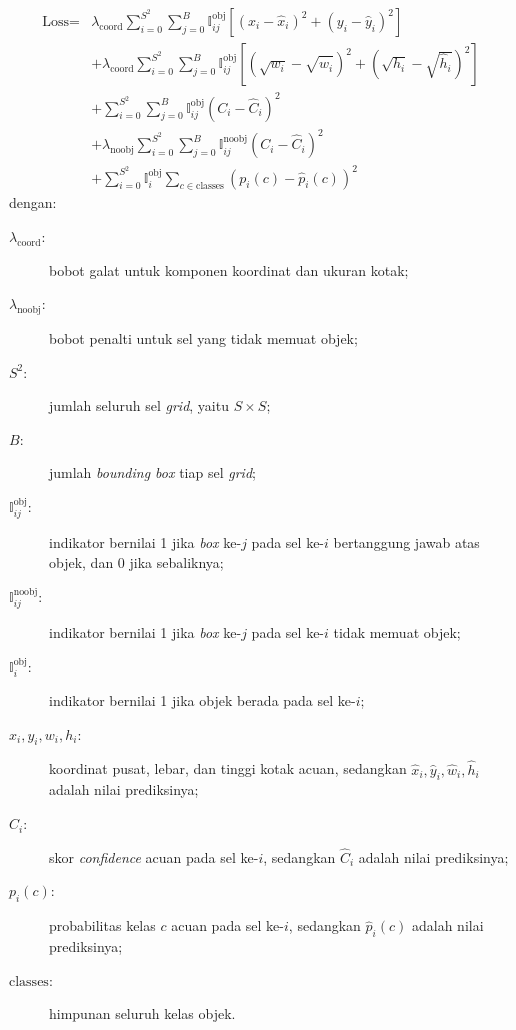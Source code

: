 \begin{equation}
\label{eq:yolo_loss}
\begin{split} \text{Loss} = & \lambda_{\text{coord}} \sum_{i=0}^{S^2} \sum_{j=0}^{B} \mathbb{I}_{ij}^{\text{obj}} \left[ (x_i - \hat{x}_i)^2 + (y_i - \hat{y}_i)^2 \right] \\ & + \lambda_{\text{coord}} \sum_{i=0}^{S^2} \sum_{j=0}^{B} \mathbb{I}_{ij}^{\text{obj}} \left[ (\sqrt{w_i} - \sqrt{\hat{w}_i})^2 + (\sqrt{h_i} - \sqrt{\hat{h}_i})^2 \right] \\ & + \sum_{i=0}^{S^2} \sum_{j=0}^{B} \mathbb{I}_{ij}^{\text{obj}} (C_i - \hat{C}_i)^2 \\ & + \lambda_{\text{noobj}} \sum_{i=0}^{S^2} \sum_{j=0}^{B} \mathbb{I}_{ij}^{\text{noobj}} (C_i - \hat{C}_i)^2 \\ & + \sum_{i=0}^{S^2} \mathbb{I}_{i}^{\text{obj}} \sum_{c \in \text{classes}} (p_i(c) - \hat{p}_i(c))^2
\end{split}
\end{equation}
\noindent dengan:
\begin{description}
  \item[$\lambda_{\text{coord}}$:] bobot galat untuk komponen koordinat dan ukuran kotak;
  \item[$\lambda_{\text{noobj}}$:] bobot penalti untuk sel yang tidak memuat objek;
  \item[$S^2$:] jumlah seluruh sel \textit{grid}, yaitu $S \times S$;
  \item[$B$:] jumlah \textit{bounding box} tiap sel \textit{grid};
  \item[$\mathbb{I}_{ij}^{\text{obj}}$:] indikator bernilai 1 jika \textit{box} ke-$j$ pada sel ke-$i$ bertanggung jawab atas objek, dan 0 jika sebaliknya;
  \item[$\mathbb{I}_{ij}^{\text{noobj}}$:] indikator bernilai 1 jika \textit{box} ke-$j$ pada sel ke-$i$ tidak memuat objek;
  \item[$\mathbb{I}_{i}^{\text{obj}}$:] indikator bernilai 1 jika objek berada pada sel ke-$i$;
  \item[$x_i, y_i, w_i, h_i$:] koordinat pusat, lebar, dan tinggi kotak acuan, sedangkan $\hat{x}_i, \hat{y}_i, \hat{w}_i, \hat{h}_i$ adalah nilai prediksinya;
  \item[$C_i$:] skor \textit{confidence} acuan pada sel ke-$i$, sedangkan $\hat{C}_i$ adalah nilai prediksinya;
  \item[$p_i(c)$:] probabilitas kelas $c$ acuan pada sel ke-$i$, sedangkan $\hat{p}_i(c)$ adalah nilai prediksinya;
  \item[$\text{classes}$:] himpunan seluruh kelas objek.
\end{description}

